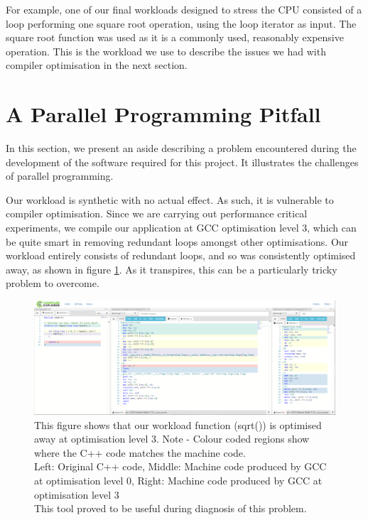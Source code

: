 For example, one of our final workloads designed to stress the CPU consisted of a loop performing one square root operation, using the loop iterator as input. The square root function was used as it is a commonly used, reasonably expensive operation. This is the workload we use to describe the issues we had with compiler optimisation in the next section.



\section{A Parallel Programming Pitfall}
\label{section:implementation:a_parallel_programming_pitfall}

In this section, we present an aside describing a problem encountered during the development of the software required for this project. It illustrates the challenges of parallel programming. 

Our workload is synthetic with no actual effect. As such, it is vulnerable to compiler optimisation. Since we are carrying out performance critical experiments, we compile our application at GCC optimisation level 3, which can be quite smart in removing redundant loops amongst other optimisations. Our workload entirely consists of redundant loops, and so was consistently optimised away, as shown in figure \ref{fig:compiler_explorer_example}. As it transpires, this can be a particularly tricky problem to overcome.



\begin{figure}
    \includegraphics[width=\textwidth]{graphics/compiler_explorer_example.png}
    \caption{This figure shows that our workload function (sqrt()) is optimised away at optimisation level 3. Note - Colour coded regions show where the C++ code matches the machine code. \\
            Left: Original C++ code, Middle: Machine code produced by GCC at optimisation level 0, Right: Machine code produced by GCC at optimisation level 3 \\
            This tool \cite{compiler_explorer} proved to be useful during diagnosis of this problem.}
    \label{fig:compiler_explorer_example}
\end{figure}



